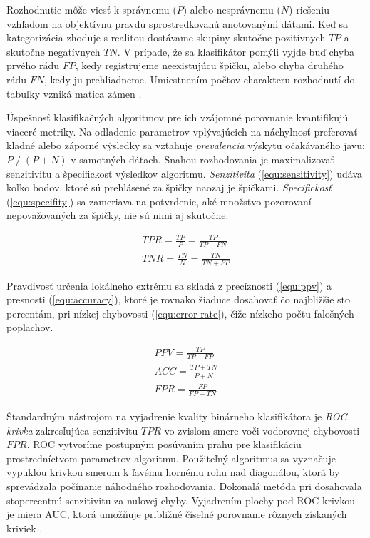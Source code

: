 Rozhodnutie môže viesť k správnemu ($P$) alebo nesprávnemu ($N$) riešeniu vzhľadom na objektívnu pravdu
sprostredkovanú anotovanými dátami. Keď sa kategorizácia zhoduje s realitou dostávame skupiny
skutočne pozitívnych $TP$ a skutočne negatívnych $TN$. V prípade, že sa klasifikátor pomýli vyjde buď chyba
prvého rádu $FP$, kedy registrujeme neexistujúcu špičku, alebo chyba druhého rádu $FN$, kedy ju prehliadneme.
Umiestnením počtov charakteru rozhodnutí do tabuľky vzniká matica zámen \cite{binary-classifier}.

Úspešnosť klasifikačných algoritmov pre ich vzájomné porovnanie kvantifikujú viaceré metriky. Na odladenie parametrov
vplývajúcich na náchylnosť preferovať kladné alebo záporné výsledky sa vzťahuje \emph{prevalencia} výskytu očakávaného
javu: $P\;/\;(P+N)$ v samotných dátach. Snahou rozhodovania je maximalizovať senzitivitu a špecifickosť výsledkov algoritmu.
\emph{Senzitivita} (\ref{equ:sensitivity}) udáva koľko bodov, ktoré sú prehlásené za špičky naozaj je špičkami.
\emph{Špecifickosť} (\ref{equ:specifity}) sa zameriava na potvrdenie, aké množstvo pozorovaní nepovažovaných za špičky,
nie sú nimi aj skutočne.
\begin{ceqn}\begin{align}
TPR = \frac{TP}{P} = \frac{TP}{TP + FN} \label{equ:sensitivity} \\
TNR = \frac{TN}{N} = \frac{TN}{TN + FP} \label{equ:specifity}
\end{align}\end{ceqn}

Pravdivosť určenia lokálneho extrému sa skladá z precíznosti (\ref{equ:ppv}) a presnosti (\ref{equ:accuracy}),
ktoré je rovnako žiaduce dosahovať čo najbližšie sto percentám, pri nízkej chybovosti (\ref{equ:error-rate}), čiže
nízkeho počtu falošných poplachov.
\begin{ceqn}\begin{align}
PPV = \frac{TP}{TP + FP} \label{equ:ppv} \\
ACC = \frac{TP + TN}{P + N}\label{equ:accuracy} \\
FPR = \frac{FP}{FP + TN} \label{equ:error-rate}
\end{align}\end{ceqn}


Štandardným nástrojom na vyjadrenie kvality binárneho klasifikátora je \emph{ROC krivka} zakresľujúca
senzitivitu $TPR$ vo zvislom smere voči vodorovnej chybovosti $FPR$. ROC vytvoríme postupným posúvaním prahu
pre klasifikáciu prostredníctvom parametrov algoritmu. Použiteľný algoritmus sa vyznačuje vypuklou krivkou
smerom k ľavému hornému rohu nad diagonálou, ktorá by sprevádzala počínanie náhodného rozhodovania. Dokonalá
metóda pri dosahovala stopercentnú senzitivitu za nulovej chyby. Vyjadrením plochy pod
ROC krivkou je miera AUC, ktorá umožňuje približné číselné porovnanie rôznych získaných kriviek \cite{roc-analysis}.

